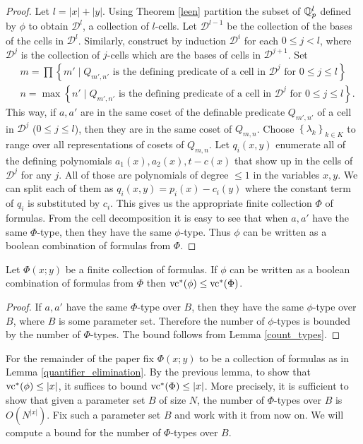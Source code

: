 \documentclass{amsart}
\newcommand{\DD}{\mathscr D}
\newcommand{\curly}[1]{\left\{#1\right\}}
\begin{document}
\begin{proof}
  Let $l = |x| + |y|$.
  Using Theorem \ref{leen} partition the subset of $\mathbb{Q}_p^l$ defined by $\phi$ to obtain $\DD^l$, a collection of $l$-cells.
  Let $\DD^{l-1}$ be the collection of the bases of the cells in $\DD^l$.
  Similarly, construct by induction $\DD^i$ for each $0 \leq j < l$,
  where $\DD^j$ is the collection of $j$-cells which are the bases of cells in $\DD^{j+1}$.
  Set
  \begin{align*}
    &m = \prod \curly{m' \mid Q_{m',n'} \text{ is the defining predicate of a cell in $\DD^j$ for $0 \leq j \leq l$} } \\
    &n = \max \curly{n' \mid Q_{m',n'} \text{ is the defining predicate of a cell in $\DD^j$ for $0 \leq j \leq l$} }.
  \end{align*}
  This way, if $a, a'$ are in the same coset of the definable predicate
  $Q_{m',n'}$ of a cell in $\DD^j$ ($0 \leq j \leq l$),
  then they are in the same coset of $Q_{m,n}$.
  Choose $\curly{\lambda_k}_{k \in K}$ to range over all representations of cosets of $Q_{m,n}$.
  Let $q_i(x, y)$ enumerate all of the defining polynomials $a_1(x), a_2(x), t - c(x)$ that show up in the cells of $\DD^j$ for any $j$.
  All of those are polynomials of degree $\leq 1$ in the variables $x, y$.
  We can split each of them as $q_i(x,y) = p_i(x) - c_i(y)$ where the constant term of $q_i$ is substituted by $c_i$.
  This gives us the appropriate finite collection $\Phi$ of formulas.
  From the cell decomposition it is easy to see that when $a, a'$ have the same $\Phi$-type,
  then they have the same $\phi$-type.
  Thus $\phi$ can be written as a boolean combination of formulas from $\Phi$.
\end{proof}

\begin{Lemma}
  Let $\Phi(x; y)$ be a finite collection of formulas.
  If $\phi$ can be written as a boolean combination of formulas from $\Phi$ then $\operatorname{vc}^* (\phi) \leq \operatorname{vc}^* (\Phi)$.
\end{Lemma}
\begin{proof}
  If $a,a'$ have the same $\Phi$-type over $B$, then they have the same $\phi$-type over $B$, where $B$ is some parameter set.
  Therefore the number of $\phi$-types is bounded by the number of $\Phi$-types.
  The bound follows from Lemma \ref{count_types}.
\end{proof}

For the remainder of the paper fix $\Phi(x; y)$ to be a collection of formulas as in Lemma \ref{quantifier_elimination}.
By the previous lemma, to show that $\operatorname{vc}^*(\phi) \leq |x|$, it suffices to bound $\operatorname{vc}^*(\Phi) \leq |x|$.
More precisely, it is sufficient to show that given a parameter set $B$ of size $N$,
the number of $\Phi$-types over $B$ is $O(N^{|x|})$.
Fix such a parameter set $B$ and work with it from now on.
We will compute a bound for the number of $\Phi$-types over $B$.
\end{document}
